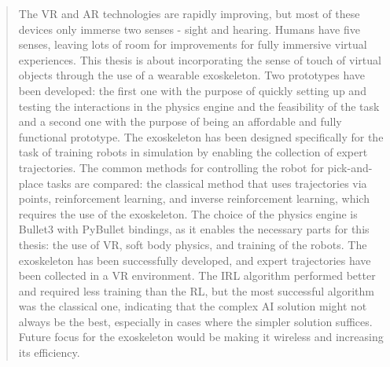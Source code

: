 \begin{abstract}
\noindent
The VR and AR technologies are rapidly improving, but most of these devices only immerse two senses - sight and hearing. Humans have five senses, leaving lots of room for improvements for fully immersive virtual experiences. This thesis is about incorporating the sense of touch of virtual objects through the use of a wearable exoskeleton. Two prototypes have been developed: the first one with the purpose of quickly setting up and testing the interactions in the physics engine and the feasibility of the task and a second one with the purpose of being an affordable and fully functional prototype. The exoskeleton has been designed specifically for the task of training robots in simulation by enabling the collection of expert trajectories. The common methods for controlling the robot for pick-and-place tasks are compared: the classical method that uses trajectories via points, reinforcement learning, and inverse reinforcement learning, which requires the use of the exoskeleton. The choice of the physics engine is Bullet3 with PyBullet bindings, as it enables the necessary parts for this thesis: the use of VR, soft body physics, and training of the robots. The exoskeleton has been successfully developed, and expert trajectories have been collected in a VR environment. The IRL algorithm performed better and required less training than the RL, but the most successful algorithm was the classical one, indicating that the complex AI solution might not always be the best, especially in cases where the simpler solution suffices. Future focus for the exoskeleton would be making it wireless and increasing its efficiency.
\end{abstract}

\newpage
